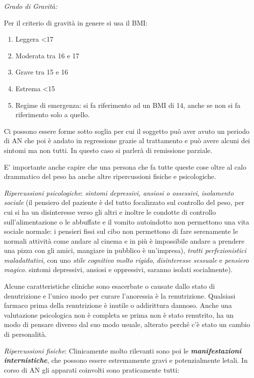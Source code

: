 \documentclass[]{article}
\begin{document}
\emph{\emph{Grado di Gravità:}}

Per il criterio di gravità in genere si usa il BMI:

\begin{enumerate}
\def\labelenumi{\arabic{enumi}.}
\item
  Leggera \textless{}17
\item
  Moderata tra 16 e 17
\item
  Grave tra 15 e 16
\item
  Estrema \textless{}15
\item
  Regime di emergenza: si fa riferimento ad un BMI di 14, anche se non
  si fa riferimento solo a quello.
\end{enumerate}

Ci possono essere forme sotto soglia per cui il soggetto può aver avuto
un periodo di AN che poi è andato in regressione grazie al trattamento e
può avere alcuni dei sintomi ma non tutti. In questo caso si parlerà di
remissione parziale.

E' importante anche capire che una persona che fa tutte queste cose
oltre al calo drammatico del peso ha anche altre ripercussioni fisiche e
psicologiche.

\emph{\emph{Ripercussioni psicologiche}}: \emph{sintomi depressivi,
ansiosi o ossessivi}, \emph{isolamento sociale} (il pensiero del
paziente è del tutto focalizzato sul controllo del peso, per cui si ha
un disinteresse verso gli altri e inoltre le condotte di controllo
sull'alimentazione o le abbuffate e il vomito autoindotto non permettono
una vita sociale normale: i pensieri fissi sul cibo non permettono di
fare serenamente le normali attività come andare al cinema e in più è
impossibile andare a prendere una pizza con gli amici, mangiare in
pubblico è un'impresa), \emph{tratti perfezionistici maladattativi}, con
uno \emph{stile cognitivo molto rigido}, \emph{disinteresse sessuale} e
\emph{pensiero magico}. sintomi depressivi, ansiosi e oppressivi,
saranno isolati socialmente).

Alcune caratteristiche cliniche sono esacerbate o causate dallo stato di
denutrizione e l'unico modo per curare l'anoressia è la renutrizione.
Qualsiasi farmaco prima della renutrizione è inutile o addirittura
dannoso. Anche una valutazione psicologica non è completa se prima non è
stato renutrito, ha un modo di pensare diverso dal suo modo usuale,
alterato perché c'è stato un cambio di personalità.

\emph{\emph{Ripercussioni fisiche}}: Clinicamente molto rilevanti sono
poi le \textbf{\emph{manifestazioni internistiche}}, che possono essere
estremamente gravi e potenzialmente letali. In corso di AN gli apparati
coinvolti sono praticamente tutti:
\end{document}
